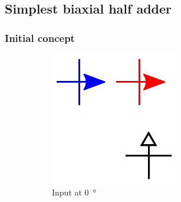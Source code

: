 \documentclass[11pt,a4paper,english]{article}
\newcommand{\rulesep}{\unskip\ \vrule\ }
\begin{document}
\subsection{Simplest biaxial half adder}
\subsubsection{Initial concept}
\begin{figure}
\centering
\begin{subfigure}[t]{0.23\textwidth}
    \includegraphics[width=\textwidth]{Figures/half_adder/schematic/000006_inputs_In1_0213/Input 0 deg.pdf}
    \caption{Input at \SI{0}{\degree}}
\end{subfigure}
\rulesep
\begin{subfigure}[t]{0.23\textwidth}

\end{subfigure}
\end{figure}
\end{document}
